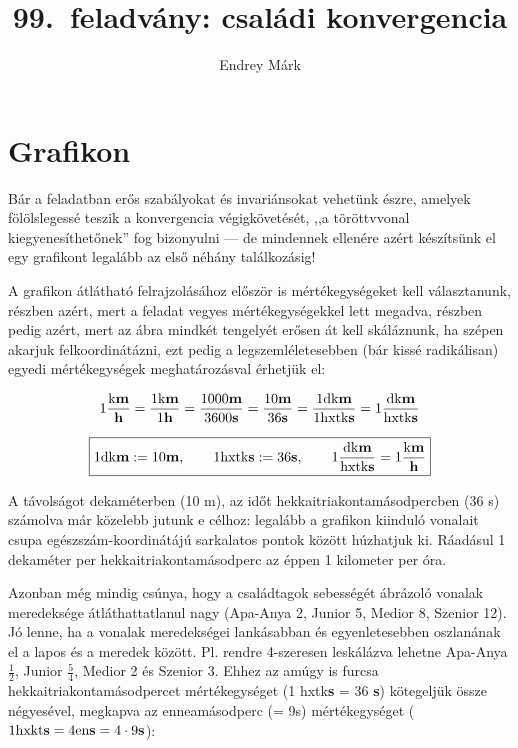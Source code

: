 \documentclass{article}
\title{99.~feladvány: családi konvergencia}
\author{Endrey Márk}
\begin{document}
	\maketitle

	\section{Grafikon}

	Bár a feladatban erős szabályokat és invariánsokat vehetünk észre, amelyek fölölslegessé teszik a konvergencia végigkövetését, ,,a töröttvvonal kiegyenesíthetőnek'' fog bizonyulni --- de mindennek ellenére azért készítsünk el egy grafikont legalább az első néhány találkozásig!

	A grafikon átlátható felrajzolásához először is mértékegységeket kell választanunk, részben azért, mert a feladat vegyes mértékegységekkel lett megadva, részben pedig azért, mert az ábra mindkét tengelyét erősen át kell skáláznunk, ha szépen akarjuk felkoordinátázni, ezt pedig a legszemléletesebben (bár kissé radikálisan) egyedi mértékegységek meghatározásval érhetjük el:

	\[1 \frac{\text{k\bf m}}{\text{\bf h}} = \frac{1 \text{k\bf m}}{1 \text{\bf h}} = \frac{1000 \text{\bf m}}{3600 \text{\bf s}} = \frac{10 \text{\bf m}}{36 \text{\bf s}} = \frac{1 \text{dk\bf m}}{1 \text{hxtk\bf s}} = 1 \frac{\text{dk\bf m}}{\text{hxtk\bf s}}\]

	\[\boxed{1\text{dk\bf m} := 10\text{\bf m},\hspace{2em}1\text{hxtk\bf s} := 36 \text{\bf s},\hspace{2em}1 \frac{\text{dk\bf m}}{\text{hxtk\bf s}} = 1 \frac{\text{k\bf m}}{\text{\bf h}}}\]

	A távolságot dekaméterben (10 m), az időt hekkai\-triakonta\-másodpercben (36 s) számolva már közelebb jutunk e célhoz: legalább a grafikon kiinduló vonalait csupa egészszám-koordinátájú sarkalatos pontok között húzhatjuk ki. Ráadásul 1 dekaméter per hekkai\-triakonta\-másodperc az éppen 1 kilometer per óra.

	Azonban még mindig csúnya, hogy a családtagok sebességét ábrázoló vonalak meredeksége átláthattatlanul nagy (Apa-Anya 2, Junior 5, Medior 8, Szenior 12). Jó lenne, ha a vonalak meredekségei lankásabban és egyenletesebben oszlanának el a lapos és a meredek között. Pl. rendre 4-szeresen leskálázva lehetne Apa-Anya $\frac12$, Junior $\frac54$, Medior 2 és Szenior 3. Ehhez az amúgy is furcsa hekkai\-triakonta\-másodpercet mértékegységet (1 hxtk{\bf s} = 36 {\bf s}) kötegeljük össze négyesével, megkapva az ennea\-másodperc (= 9s) mértékegységet ($1 \text{hxkt{\bf s}} = 4 \text{en{\bf s}} = 4\cdot 9 \text{{\bf s}}$):
\end{document}
